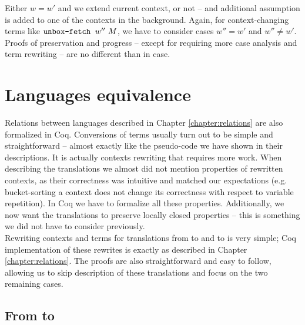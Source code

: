 Either $w=w'$ and we extend current context, or not -- and additional assumption is added to one of the contexts in the background. Again, for context-changing terms like $\mbox{$\operatorname{\texttt{unbox-fetch}}_{}\ {w''}\ {M}$}$, we have to consider cases $w''=w'$ and $w''\neq w'$.\\

Proofs of preservation and progress -- except for requiring more case analysis and term rewriting -- are no different than in \langL{} case.

\section{Languages equivalence}

Relations between languages described in Chapter \ref{chapter:relations} are also formalized in Coq. Conversions of terms usually turn out to be simple and straightforward -- almost exactly like the pseudo-code we have shown in their descriptions. It is actually contexts rewriting that requires more work. When describing the translations we almost did not mention properties of rewritten contexts, as their correctness was intuitive and matched our expectations (e.g. bucket-sorting a context does not change its correctness with respect to variable repetition). In Coq we have to formalize all these properties. Additionally, we now want the translations to preserve locally closed properties -- this is something we did not have to consider previously.\\

Rewriting contexts and terms for translations from \langHyb{} to \langL{} and to \langLF{} is very simple; Coq implementation of these rewrites is exactly as described in Chapter \ref{chapter:relations}. The proofs are also straightforward and easy to follow, allowing us to skip description of these translations and focus on the two remaining cases.

\subsection{From \langL{} to \langHyb{}}

